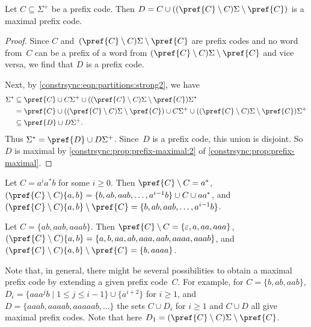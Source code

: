 \begin{proposition} \label{constrsync:prop:prefix-maximalD}
	Let $C \subseteq \Sigma^+$ be a prefix code.
	Then $D = C \cup ( ( \pref{C} \setminus C ) \Sigma \setminus \pref{C} )$
	is a maximal prefix code.
\end{proposition}
\begin{proof}
	Since $C$ and~$( \pref{C} \setminus C ) \Sigma \setminus \pref{C}$
	are prefix codes
	and no word from~$C$ can be a prefix of a word
	from $( \pref{C} \setminus C ) \Sigma \setminus \pref{C}$
	and vice versa, we find that $D$ is a prefix code.
	
	Next, by \cref{constrsync:eqn:partitions:strong2}, we have
	\begin{align*}
	\Sigma^* & \subseteq \pref{C} \cup C\Sigma^+ \cup 
	((\pref{C}\setminus C)\Sigma \setminus \pref{C})\Sigma^* \\
	& = \pref{C} \cup ((\pref{C}\setminus C)\Sigma \setminus \pref{C}) 
	\cup C\Sigma^+ \cup ((\pref{C}\setminus C)\Sigma \setminus \pref{C})\Sigma^+ \\
	& \subseteq \pref{D} \cup D\Sigma^+.
	\end{align*}
	Thus $\Sigma^* = \pref{D} \cup D\Sigma^+$.
	Since~$D$ is a prefix code, this union is disjoint.
	So $D$ is maximal by \cref{constrsync:prop:prefix-maximal:2} of \cref{constrsync:prop:prefix-maximal}.	
\end{proof}

\begin{example}
	Let $C = a^i a^* b$ for some $i \ge 0$.
	Then $\pref{C} \setminus C = a^*$,
	$(\pref{C} \setminus C )\{a,b\} = \{ b, ab, aab, \ldots, a^{i-1}b \} \cup C \cup aa^*$,
	and $(\pref{C} \setminus C )\{a,b\} \setminus \pref{C} = 
	\{ b, ab, aab, \ldots, a^{i-1}b \}$.	
\end{example}

\begin{example}
	Let $C = \{ab,aab,aaab\}$.
	Then $\pref{C} \setminus C = \{ \varepsilon,a,aa,aaa\}$,
	$( \pref{C} \setminus C )\{a,b\} = \{ a, b, aa, ab, aaa, aab, aaaa, aaab \}$,
	and $( \pref{C} \setminus C )\{a,b\} \setminus \pref{C}
	= \{ b, aaaa \}$.
\end{example}

\begin{remark}
	Note that, in general, there might be several possibilities to obtain a maximal
	prefix code by extending a given prefix code~$C$.
	For example, for $C = \{b, ab, aab\}$,
	$D_i = \{ aaa^jb \mid 1 \le j \le i - 1 \}\cup \{ a^{i+2} \}$ for $i \ge 1$,
	and $D = \{ aaab, aaaab, aaaaab, \ldots \}$
	the sets $C \cup D_i$ for $i \ge 1$
	and $C \cup D$ all give maximal prefix codes.
	Note that here $D_1 = (\pref{C} \setminus C)\Sigma \setminus \pref{C}$.	
\end{remark}

